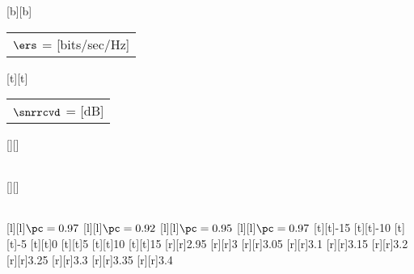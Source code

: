 %    
%
%
%
[b][b]{\color[rgb]{0,0,0}\setlength{\tabcolsep}{0pt}\begin{tabular}{c}$\ers$ = [bits/sec/Hz]\end{tabular}}%
[t][t]{\color[rgb]{0,0,0}\setlength{\tabcolsep}{0pt}\begin{tabular}{c}$\snrrcvd$ = [dB]\end{tabular}}%
[][]{\color[rgb]{0,0,0}\setlength{\tabcolsep}{0pt}\begin{tabular}{c} \end{tabular}}%
[][]{\color[rgb]{0,0,0}\setlength{\tabcolsep}{0pt}\begin{tabular}{c} \end{tabular}}%
[l][l]{\color[rgb]{0,0,0}$\pc = 0.97$}%
[l][l]{\color[rgb]{0,0,0}$\pc = 0.92$}%
[l][l]{\color[rgb]{0,0,0}$\pc = 0.95$}%
[l][l]{\color[rgb]{0,0,0}$\pc = 0.97$}%
%
[t][t]{-15}%
[t][t]{-10}%
[t][t]{-5}%
[t][t]{0}%
[t][t]{5}%
[t][t]{10}%
[t][t]{15}%
%
[r][r]{2.95}%
[r][r]{3}%
[r][r]{3.05}%
[r][r]{3.1}%
[r][r]{3.15}%
[r][r]{3.2}%
[r][r]{3.25}%
[r][r]{3.3}%
[r][r]{3.35}%
[r][r]{3.4}%
%
%
